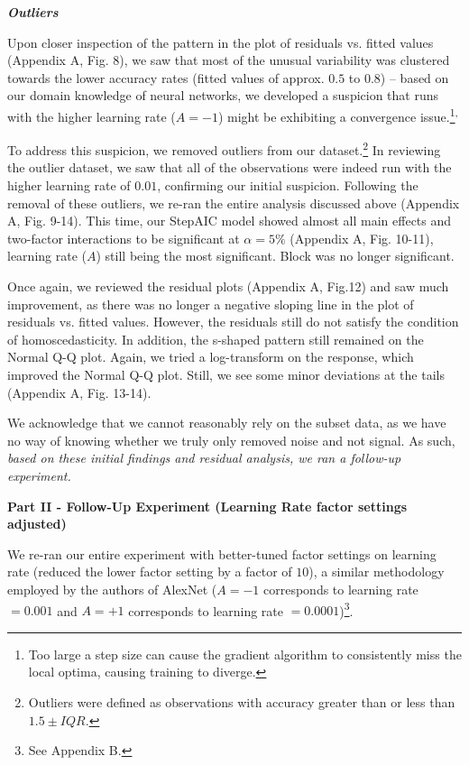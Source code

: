 \documentclass[12pt]{article}
\begin{document}
\vspace{.5pc}
\noindent \textbf{\textit{Outliers}}
\vspace{.1pc}

Upon closer inspection of the pattern in the plot of residuals vs. fitted values (Appendix A, Fig. 8), we saw that most of the unusual variability was clustered towards the lower accuracy rates (fitted values of approx. $0.5$ to $0.8$) – based on our domain knowledge of neural networks, we developed a suspicion that runs with the higher learning rate ($A = -1$) might be exhibiting a convergence issue.\footnote{Too large a step size can cause the gradient algorithm to consistently miss the local optima, causing training to diverge.}\textsuperscript{,}
 
To address this suspicion, we removed outliers from our dataset.\footnote{Outliers were defined as observations with accuracy greater than or less than $1.5\pm IQR$.} In reviewing the outlier dataset, we saw that all of the observations were indeed run with the higher learning rate of $0.01$, confirming our initial suspicion. Following the removal of these outliers, we re-ran the entire analysis discussed above (Appendix A, Fig. 9-14). This time, our StepAIC model showed almost all main effects and two-factor interactions to be significant at $\alpha = 5\%$ (Appendix A, Fig. 10-11), learning rate ($A$) still being the most significant. Block was no longer significant.

Once again, we reviewed the residual plots (Appendix A, Fig.12) and saw much improvement, as there was no longer a negative sloping line in the plot of residuals vs. fitted values. However, the residuals still do not satisfy the condition of homoscedasticity. In addition, the s-shaped pattern still remained on the Normal Q-Q plot. Again, we tried a log-transform on the response, which improved the Normal Q-Q plot. Still, we see some minor deviations at the tails (Appendix A, Fig. 13-14). 

We acknowledge that we cannot reasonably rely on the subset data, as we have no way of knowing whether we truly only removed noise and not signal. As such, \textit{based on these initial findings and residual analysis, we ran a follow-up experiment.}


\vspace{.5pc}
{\noindent \sc \textbf{Part II - Follow-Up Experiment (Learning Rate factor settings adjusted) }}

We re-ran our entire experiment with better-tuned factor settings on learning rate (reduced the lower factor setting by a factor of $10$), a similar methodology employed by the authors of AlexNet ($A = -1$ corresponds to learning rate $= 0.001$ and $A= +1$ corresponds to learning rate $= 0.0001$)\footnote{See Appendix B.}. 
\end{document}
